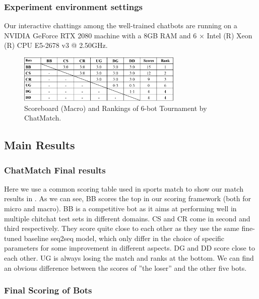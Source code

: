 \subsubsection*{Experiment environment settings}
Our interactive chattings among the well-trained chatbots are running on a NVIDIA GeForce RTX 2080 machine with a 8GB RAM and 6 × Intel (R) Xeon (R) CPU E5-2678 v3 @ 2.50GHz.   
\begin{figure}[th]
\centering
\includegraphics[width=0.7\textwidth]{macro.eps}
\caption{Scoreboard (Macro) and Rankings of 6-bot Tournament by ChatMatch.}
\label{fig:macro}
\end{figure}

\subsection{Main Results }
\subsubsection*{ChatMatch Final results}
Here we use a common scoring table used in sports match to show our match results in . 
As we can see,  BB scores the top in our scoring framework (both for micro and macro). 
BB is a competitive bot as it aims at performing well in multiple chitchat test sets in different domains. 
CS and CR come in second and third respectively. They score quite close to each other as they use the same fine-tuned baseline seq2seq model, which only differ in the 
choice of specific parameters for some improvement in different aspects. 
DG and DD score close to each other. UG is always losing the match and ranks at the bottom. 
We can find an obvious difference between the scores of  
''the loser'' and the other five bots.

\subsubsection*{Final Scoring of Bots}

